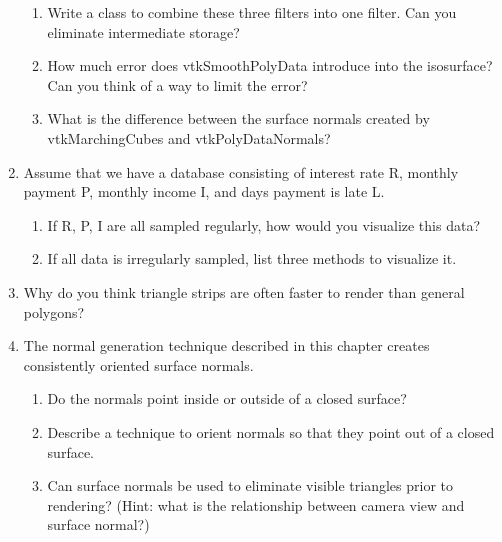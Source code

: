 \begin{enumerate}
    \begin{enumerate}

    \item Write a class to combine these three filters into one filter. Can you eliminate intermediate storage?

    \item How much error does vtkSmoothPolyData introduce into the isosurface? Can you think of a way to limit the error?

    \item What is the difference between the surface normals created by vtkMarchingCubes and vtkPolyDataNormals?

    \end{enumerate}

\item Assume that we have a database consisting of interest rate R, monthly payment P, monthly income I, and days payment is late L.

    \begin{enumerate}

    \item If R, P, I are all sampled regularly, how would you visualize this data?

    \item If all data is irregularly sampled, list three methods to visualize it.

    \end{enumerate}

\item Why do you think triangle strips are often faster to render than general polygons?

\item The normal generation technique described in this chapter creates consistently oriented surface normals.

    \begin{enumerate}

    \item Do the normals point inside or outside of a closed surface?

    \item Describe a technique to orient normals so that they point out of a closed surface.

    \item Can surface normals be used to eliminate visible triangles prior to rendering? (Hint: what is the relationship between camera view and surface normal?)

    \end{enumerate}


\end{enumerate}
